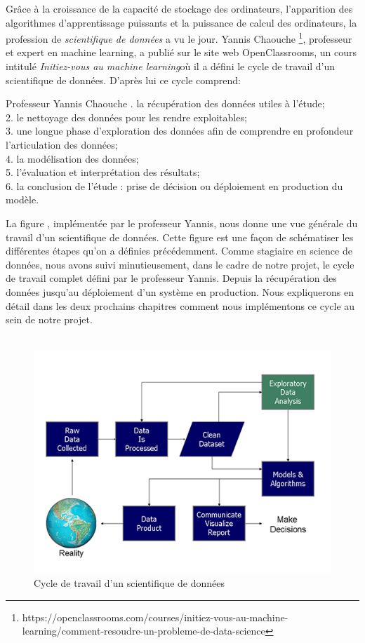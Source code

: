 \documentclass[12pt, french]{report}
\begin{document}
Grâce à la croissance de la capacité de stockage des ordinateurs, l'apparition des algorithmes d'apprentissage puissants et la puissance de calcul des ordinateurs, la profession de \textit{scientifique de données} a vu le jour. Yannis Chaouche \footnote{https://openclassrooms.com/courses/initiez-vous-au-machine-learning/comment-resoudre-un-probleme-de-data-science}, professeur et expert en machine learning, a publié sur le site web OpenClassrooms, un cours intitulé  \guillemotleft \textit{Initiez-vous au machine learning}\guillemotright  où il a défini le cycle de travail d'un scientifique de données. D'après lui ce cycle comprend:

\begin{pquotation}{Professeur Yannis Chaouche}
		. la récupération des données utiles à l'étude;\\
		2. le nettoyage des données pour les rendre exploitables;\\
		3. une longue phase d'exploration des données afin de comprendre en profondeur l'articulation des données;\\
		4. la modélisation des données;\\
		5. l'évaluation et interprétation des résultats;\\
		6. la conclusion de l'étude : prise de décision ou déploiement en production du modèle.
\end{pquotation}  
		

La figure \cite{key6}, implémentée par le professeur Yannis,  nous donne une vue générale du travail d'un scientifique de données. Cette figure est une façon de schématiser les différentes étapes qu'on a définies précédemment. Comme stagiaire en science de données, nous avons suivi minutieusement, dans le cadre de notre projet, le cycle de travail complet défini par le professeur Yannis. Depuis la récupération des données jusqu'au déploiement d'un système en production. Nous expliquerons en détail dans les deux prochains chapitres comment nous implémentons ce cycle au sein de notre projet. \\ \\
\begin{figure}[h]
\includegraphics[]{images/workflow_datascientis.png}
\caption{Cycle de travail d'un scientifique de données}
\label{workflow_datascientis}
\end{figure}
\end{document}
